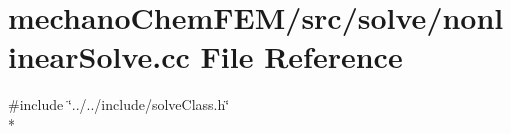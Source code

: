\section{mechano\-Chem\-F\-E\-M/src/solve/nonlinear\-Solve.cc File Reference}
\label{nonlinear_solve_8cc}
{\ttfamily \#include \char`\"{}../../include/solve\-Class.\-h\char`\"{}}\\*

